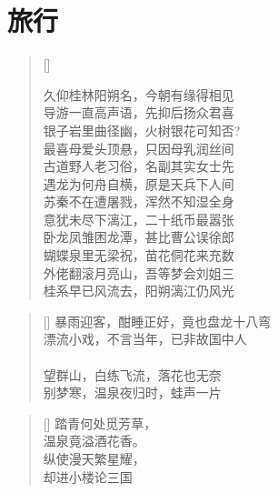\chapter{旅行}
\thispagestyle{empty}
\renewcommand{\poemtoc}{section}
\settowidth{\versewidth}{久仰桂林阳朔名，今朝有缘得相见}
\begin{verse}[\versewidth]

久仰桂林阳朔名，今朝有缘得相见\\
导游一直高声语，先抑后扬众君喜\\
银子岩里曲径幽，火树银花可知否?\\
最喜母爱头顶悬，只因母乳润丝间\\
古道野人老习俗，名副其实女士先\\
遇龙为何舟自横，原是天兵下人间\\
苏秦不在遭屠戮，浑然不知湿全身\\
意犹未尽下漓江，二十纸币最嚣张\\
卧龙凤雏困龙潭，甚比曹公误徐郎\\
蝴蝶泉里无梁祝，苗花侗花来充数\\
外佬翻滚月亮山，吾等梦会刘姐三\\
桂系早已风流去，阳朔漓江仍风光
\end{verse}

\renewcommand{\poemtoc}{section}
\settowidth{\versewidth}{久仰桂林阳朔名，今朝有缘得相见}
\begin{verse}[\versewidth]
暴雨迎客，酣睡正好，竟也盘龙十八弯\\
漂流小戏，不言当年，已非故国中人\\
~\\
望群山，白练飞流，落花也无奈\\
别梦寒，温泉夜归时，蛙声一片\\
\end{verse}

\renewcommand{\poemtoc}{section}
\settowidth{\versewidth}{踏青何处觅芳草}
\begin{verse}[\versewidth]
踏青何处觅芳草，\\
温泉竟溢酒花香。\\
纵使漫天繁星耀，\\
却进小楼论三国
\end{verse}
